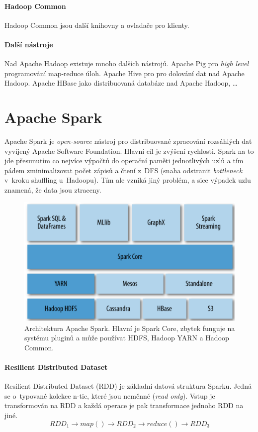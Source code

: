 \paragraph*{Hadoop Common} Hadoop Common jsou další knihovny a ovladače pro klienty.

\paragraph*{Další nástroje} Nad Apache Hadoop existuje mnoho dalších nástrojů. Apache Pig pro \textit{high level} programování map-reduce úloh. Apache Hive pro pro dolování dat nad Apache Hadoop. Apache HBase jako distribuovaná databáze nad Apache Hadoop, \dots


\section{Apache Spark}

Apache Spark je \textit{open-source} nástroj pro distribuované zpracování rozsáhlých dat vyvíjený Apache Software Foundation. Hlavní cíl je zvýšení rychlosti. Spark na to jde přesunutím co nejvíce výpočtů do operační paměti jednotlivých uzlů a tím pádem zminimalizovat počet zápisů a čtení z~DFS (snaha odstranit \textit{bottleneck} v~kroku shuffling u~Hadoopu). Tím ale vzniká jiný problém, a sice výpadek uzlu znamená, že data jsou ztraceny.

\begin{figure}[H]
    \centering
    \includegraphics[width=0.75\linewidth]{spark.png}
    \caption{Architektura Apache Spark. Hlavní je Spark Core, zbytek funguje na systému pluginů a může používat HDFS, Hadoop YARN a Hadoop Common.}
\end{figure}


\paragraph*{Resilient Distributed Dataset} Resilient Distributed Dataset (RDD) je základní datová struktura Sparku. Jedná se o~typované kolekce n-tic, které jsou neměnné (\textit{read only}). Vstup je transformován na RDD a každá operace je pak transformace jednoho RDD na jiné.
$$
RDD_1 \rightarrow map() \rightarrow RDD_2 \rightarrow reduce() \rightarrow RDD_3
$$


